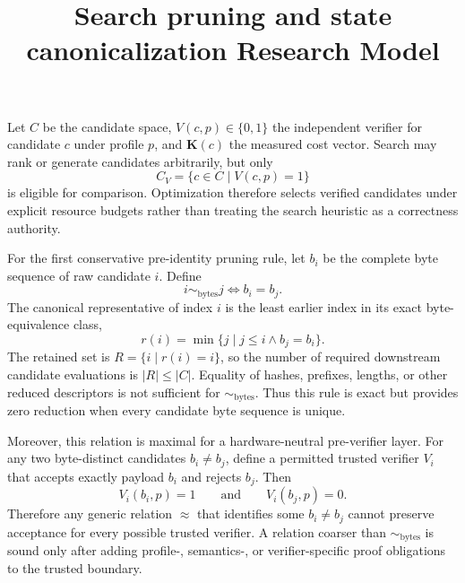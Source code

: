 \documentclass{article}
\title{Search pruning and state canonicalization Research Model}
\begin{document}
\maketitle
Let $C$ be the candidate space, $V(c,p)\in\{0,1\}$ the independent verifier
for candidate $c$ under profile $p$, and $\mathbf{K}(c)$ the measured cost
vector. Search may rank or generate candidates arbitrarily, but only
\[
  C_V = \{c\in C\mid V(c,p)=1\}
\]
is eligible for comparison. Optimization therefore selects verified candidates
under explicit resource budgets rather than treating the search heuristic as a
correctness authority.

For the first conservative pre-identity pruning rule, let $b_i$ be the complete
byte sequence of raw candidate $i$. Define
\[
  i \sim_{\mathrm{bytes}} j \iff b_i=b_j.
\]
The canonical representative of index $i$ is the least earlier index in its
exact
byte-equivalence class,
\[
  r(i)=\min\{j\mid j\le i\land b_j=b_i\}.
\]
The retained set is $R=\{i\mid r(i)=i\}$, so the number of required downstream
candidate evaluations is $|R|\le |C|$. Equality of hashes, prefixes, lengths, or
other reduced descriptors is not sufficient for $\sim_{\mathrm{bytes}}$. Thus
this rule is exact but provides zero reduction when every candidate byte
sequence
is unique.

Moreover, this relation is maximal for a hardware-neutral pre-verifier layer.
For any two byte-distinct candidates $b_i\ne b_j$, define a permitted trusted
verifier $V_i$ that accepts exactly payload $b_i$ and rejects $b_j$. Then
\[
  V_i(b_i,p)=1 \qquad\text{and}\qquad V_i(b_j,p)=0.
\]
Therefore any generic relation $\approx$ that identifies some
$b_i\ne b_j$ cannot preserve acceptance for every possible trusted verifier.
A relation coarser than $\sim_{\mathrm{bytes}}$ is sound only after adding
profile-, semantics-, or verifier-specific proof obligations to the trusted
boundary.
\end{document}
